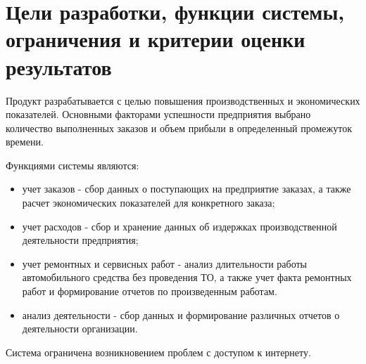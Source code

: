 \documentclass[../nirs.tex]{subfiles}
\begin{document}
\section{Цели разработки, функции системы, ограничения и критерии оценки
результатов}

Продукт разрабатывается с целью повышения производственных и экономических
показателей. Основными факторами успешности предприятия выбрано количество
выполненных заказов и объем прибыли в определенный промежуток времени.

Функциями системы являются:
\begin{itemize}
	\item учет заказов - сбор данных о поступающих на предприятие заказах, а
		также расчет экономических показателей для конкретного заказа;
	\item учет расходов - сбор и хранение данных об издержках производственной
		деятельности предприятия;
	\item учет ремонтных и сервисных работ - анализ длительности работы
		автомобильного средства без проведения ТО, а также учет факта ремонтных
		работ и формирование отчетов по произведенным работам.
	\item анализ деятельности - сбор данных и формирование различных отчетов о
		деятельности организации.
\end{itemize}

Система ограничена возникновением проблем с доступом к интернету.
\end{document}
